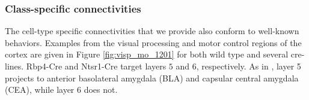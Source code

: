 \begin{comment}
\toprule
{} &  \# Ipsilateral Leaf Targets & Top Entropy & Bottom Sparsity & Bottom Entropy & Top Sparsity \\
\midrule
Isocortex &                          51 &          CP &             BAC &            BAC &         ENTl \\
OLF       &                          11 &         TMv &             III &            III &          NaN \\
HPF       &                          15 &          IG &             EPv &             PA &          NaN \\
CTXsp     &                           7 &          TT &              FC &            APr &           TT \\
STR       &                          14 &         RPA &             ISN &            PYR &           TU \\
PAL       &                           9 &          PG &           ACVII &             GR &           MG \\
TH        &                          44 &         NOD &              DN &         SSp-ll &          SCm \\
HY        &                          44 &         CLA &              SH &            LSc &           DG \\
MB        &                          39 &         NDB &            SubG &            SGN &          SUB \\
P         &                          26 &          MT &            Acs5 &            SOC &          NDB \\
MY        &                          43 &          RT &             NaN &             OV &          EPd \\
CB        &                          18 &         ECT &             AOB &            MOB &           GU \\
\bottomrule
\end{tabular}
}
}
\vspace{-4cm}
    \subfloat[]{
    \adjustbox{valign=c}{
    \texttt{[image: figs/page\_graph]}
    }
    }
\end{figure}
\end{comment}


\newpage
\subsubsection{Class-specific connectivities}
The cell-type specific connectivities that we provide also conform to well-known behaviors.
Examples from the visual processing and motor control regions of the cortex are given in Figure \ref{fig:visp_mo_1201} for both wild type and several cre-lines.
Rbp4-Cre and Ntsr1-Cre target layers $5$ and $6$, respectively. As in \citet{Jeong2016-dc}, layer 5 projects to anterior basolateral amygdala (BLA) and capsular central amygdala (CEA), while layer 6 does not.

